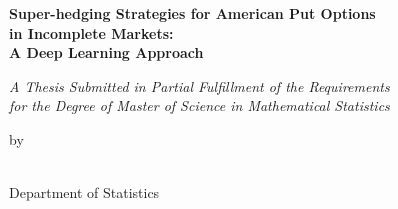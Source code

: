 \documentclass[12pt]{article}
\begin{document}
\begin{titlepage}
\centering

\vspace*{2cm}

{\Large \bfseries Super-hedging Strategies for American Put Options \\
in Incomplete Markets: \\
A Deep Learning Approach}

\vspace{1.5cm}

{\normalsize \itshape A Thesis Submitted in Partial Fulfillment of the Requirements \\
for the Degree of Master of Science in Mathematical Statistics}

\vspace{2cm}

{\normalsize by \\
[Author Name] \\
[Student ID]}

\vspace{2cm}

{\normalsize Department of Statistics \\
[University Name] \\
[Year]}

\vspace{1cm}


\end{titlepage}
\end{document}
